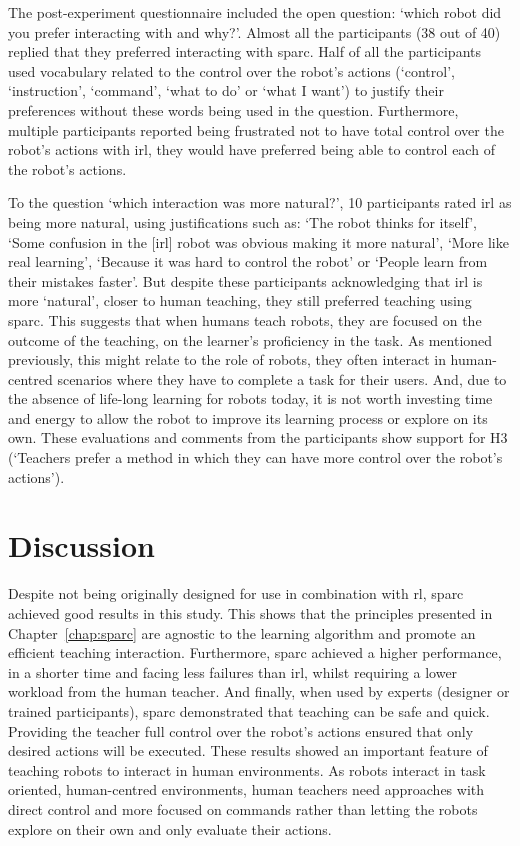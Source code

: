 The post-experiment questionnaire included the open question: `which robot did you prefer interacting with and why?'. Almost all the participants (38 out of 40) replied that they preferred interacting with \gls{sparc}. Half of all the participants used vocabulary related to the control over the robot's actions (`control', `instruction', `command', `what to do' or `what I want') to justify their preferences without these words being used in the question. Furthermore, multiple participants reported being frustrated not to have total control over the robot's actions with \gls{irl}, they would have preferred being able to control each of the robot's actions. 

To the question `which interaction was more natural?', 10 participants rated \gls{irl} as being more natural, using justifications such as: `The robot thinks for itself', `Some confusion in the [\gls{irl}] robot was obvious making it more natural', `More like real learning', `Because it was hard to control the robot' or `People learn from their mistakes faster'. But despite these participants acknowledging that \gls{irl} is more `natural', closer to human teaching, they still preferred teaching using \gls{sparc}. This suggests that when humans teach robots, they are focused on the outcome of the teaching, on the learner's proficiency in the task. As mentioned previously, this might relate to the role of robots, they often interact in human-centred scenarios where they have to complete a task for their users. And, due to the absence of life-long learning for robots today, it is not worth investing time and energy to allow the robot to improve its learning process or explore on its own. These evaluations and comments from the participants show support for H3 (`Teachers prefer a method in which they can have more control over the robot's actions').

\section{Discussion}

\label{sec:control_discussion}

Despite not being originally designed for use in combination with \acrlong{rl}, \gls{sparc} achieved good results in this study. This shows that the principles presented in Chapter~\ref{chap:sparc} are agnostic to the learning algorithm and promote an efficient teaching interaction. Furthermore, \gls{sparc} achieved a higher performance, in a shorter time and facing less failures than \gls{irl}, whilst requiring a lower workload from the human teacher. And finally, when used by experts (designer or trained participants), \gls{sparc} demonstrated that teaching can be safe and quick. Providing the teacher full control over the robot's actions ensured that only desired actions will be executed. These results showed an important feature of teaching robots to interact in human environments. As robots interact in task oriented, human-centred environments, human teachers need approaches with direct control and more focused on commands rather than letting the robots explore on their own and only evaluate their actions.

